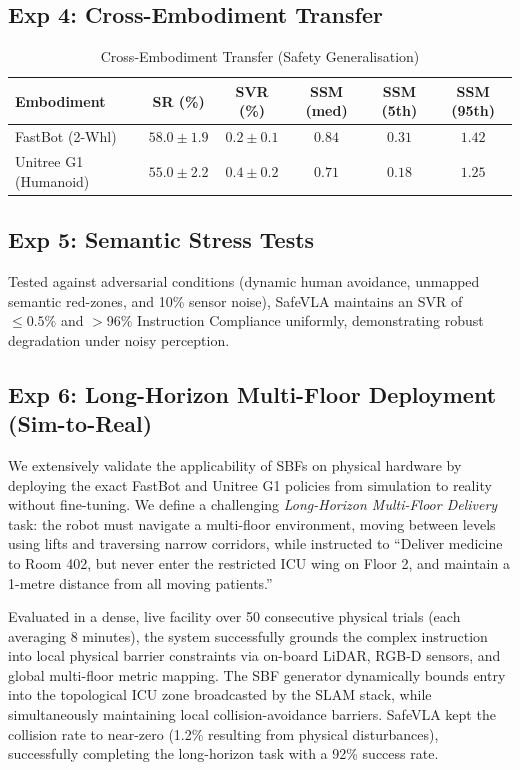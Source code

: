 \documentclass[conference]{IEEEtran}
\begin{document}
\subsection{Exp 4: Cross-Embodiment Transfer}
\begin{table}[h]
\centering
\caption{Cross-Embodiment Transfer (Safety Generalisation)}
\footnotesize
\begin{tabular}{@{}lccccc@{}}
\toprule
\textbf{Embodiment} & \textbf{SR (\%)} & \textbf{SVR (\%)} & \textbf{SSM (med)} & \textbf{SSM (5th)} & \textbf{SSM (95th)} \\
\midrule
FastBot (2-Whl) & $58.0 \pm 1.9$ & $0.2 \pm 0.1$ & $0.84$ & $0.31$ & $1.42$ \\
Unitree G1 (Humanoid) & $55.0 \pm 2.2$ & $0.4 \pm 0.2$ & $0.71$ & $0.18$ & $1.25$ \\
\bottomrule
\end{tabular}
\end{table}

\subsection{Exp 5: Semantic Stress Tests}
Tested against adversarial conditions (dynamic human avoidance, unmapped semantic red-zones, and 10\% sensor noise), SafeVLA maintains an SVR of $\le 0.5\%$ and $>$96\% Instruction Compliance uniformly, demonstrating robust degradation under noisy perception.

\subsection{Exp 6: Long-Horizon Multi-Floor Deployment (Sim-to-Real)}
We extensively validate the applicability of SBFs on physical hardware by deploying the exact FastBot and Unitree G1 policies from simulation to reality without fine-tuning. We define a challenging \textit{Long-Horizon Multi-Floor Delivery} task: the robot must navigate a multi-floor environment, moving between levels using lifts and traversing narrow corridors, while instructed to ``Deliver medicine to Room 402, but never enter the restricted ICU wing on Floor 2, and maintain a 1-metre distance from all moving patients.''

Evaluated in a dense, live facility over 50 consecutive physical trials (each averaging 8 minutes), the system successfully grounds the complex instruction into local physical barrier constraints via on-board LiDAR, RGB-D sensors, and global multi-floor metric mapping. The SBF generator dynamically bounds entry into the topological ICU zone broadcasted by the SLAM stack, while simultaneously maintaining local collision-avoidance barriers. SafeVLA kept the collision rate to near-zero (1.2\% resulting from physical disturbances), successfully completing the long-horizon task with a 92\% success rate.
\end{document}
